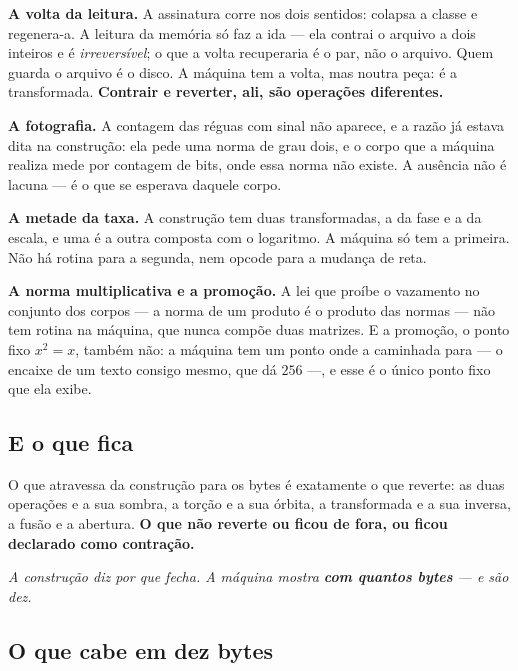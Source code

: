 \documentclass[11pt]{article}
\theoremstyle{plain}
\theoremstyle{remark}
\begin{document}
\textbf{A volta da leitura.} A assinatura corre nos dois sentidos: colapsa a
classe e regenera-a. A leitura da memória só faz a ida --- ela contrai o arquivo
a dois inteiros e é \emph{irreversível}; o que a volta recuperaria é o par, não o
arquivo. Quem guarda o arquivo é o disco. A máquina tem a volta, mas noutra
peça: é a transformada. \textbf{Contrair e reverter, ali, são operações
diferentes.}

\textbf{A fotografia.} A contagem das réguas com sinal não aparece, e a razão já
estava dita na construção: ela pede uma norma de grau dois, e o corpo que a
máquina realiza mede por contagem de bits, onde essa norma não existe. A ausência
não é lacuna --- é o que se esperava daquele corpo.

\textbf{A metade da taxa.} A construção tem duas transformadas, a da fase e a da
escala, e uma é a outra composta com o logaritmo. A máquina só tem a primeira. Não
há rotina para a segunda, nem opcode para a mudança de reta.

\textbf{A norma multiplicativa e a promoção.} A lei que proíbe o vazamento no
conjunto dos corpos --- a norma de um produto é o produto das normas --- não tem
rotina na máquina, que nunca compõe duas matrizes. E a promoção, o ponto fixo
$x^2=x$, também não: a máquina tem um ponto onde a caminhada para --- o encaixe
de um texto consigo mesmo, que dá $256$ ---, e esse é o único ponto fixo que ela
exibe.

\subsection{E o que fica}

O que atravessa da construção para os bytes é exatamente o que reverte: as duas
operações e a sua sombra, a torção e a sua órbita, a transformada e a sua
inversa, a fusão e a abertura. \textbf{O que não reverte ou ficou de fora, ou
ficou declarado como contração.}

\begin{tcolorbox}[colback=ouroclaro!35,colframe=ouro,boxrule=0pt,leftrule=2pt,arc=0pt,left=4mm,right=3mm,top=2mm,bottom=2mm,breakable]\itshape
A construção diz por que fecha. A máquina mostra \textbf{com quantos bytes} ---
e são dez.
\end{tcolorbox}

\subsection{O que cabe em dez bytes}
\end{document}

